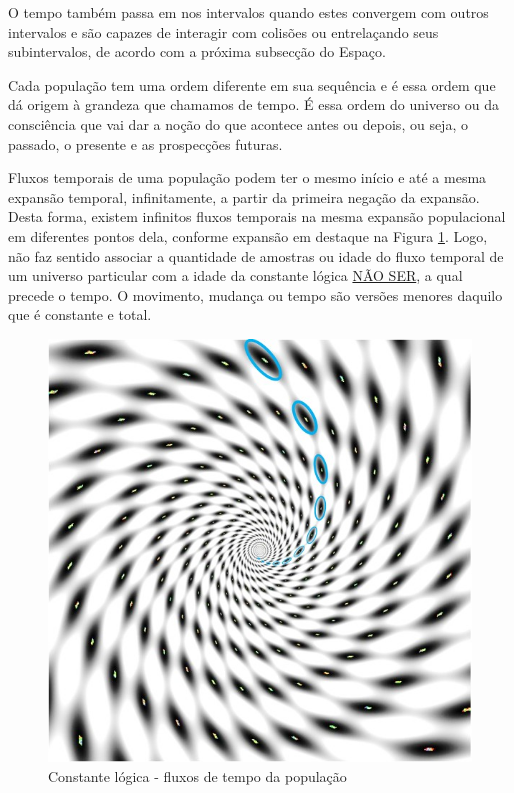 O tempo também passa em nos intervalos quando estes convergem com outros intervalos e são capazes de interagir com colisões ou entrelaçando seus subintervalos, de acordo com a próxima subsecção do Espaço.

Cada população tem uma ordem diferente em sua sequência e é essa ordem que dá origem à grandeza que chamamos de tempo. É essa ordem do universo ou da consciência que vai dar a noção do que acontece antes ou depois, ou seja, o passado, o presente e as prospecções futuras.

Fluxos temporais de uma população podem ter o mesmo início e até a mesma expansão temporal, infinitamente, a partir da primeira negação da expansão. Desta forma, existem infinitos fluxos temporais na mesma expansão populacional em diferentes pontos dela, conforme expansão em destaque na Figura \ref{fig:consciousness_constant_time}. Logo, não faz sentido associar a quantidade de amostras ou idade do fluxo temporal de um universo particular com a idade da constante lógica \underline{NÃO SER}, a qual precede o tempo. O movimento, mudança ou tempo são versões menores daquilo que é constante e total.
	\begin{figure}[H]
	\caption{Constante lógica - fluxos de tempo da população}
	\label{fig:consciousness_constant_time}
	\centering
	\includegraphics[scale=.6]{sections/images/consciousness_constant_time.jpg}
	\end{figure}

